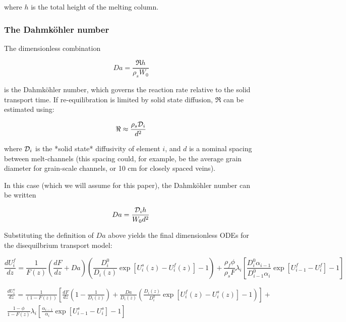 \documentclass[11pt]{article}
\begin{document}
where $h$ is the total height of the melting column.

    \hypertarget{the-dahmkuxf6hler-number}{%
\subsubsection{The Dahmköhler number}\label{the-dahmkuxf6hler-number}}

The dimensionless combination

\begin{equation}
    Da = \frac{\Re h}{\rho_s W_0}\label{eq:50}
\end{equation}

is the Dahmköhler number, which governs the reaction rate relative to the solid transport time. If re-equilibration is limited by solid state diffusion, $\Re$ can be estimated using:

\begin{equation}
    \Re \approx \frac{\rho_s{\cal D}_i}{d^2}\label{eq:51}
\end{equation}

where ${\cal D}_i$ is the *solid state* diffusivity of element $i$, and $d$ is a nominal spacing between melt-channels (this spacing could, for example, be the average grain diameter for grain-scale channels, or 10 cm for closely spaced veins). 

In this case (which we will assume for this paper),  the Dahmköhler number can be written

\begin{equation}
    Da = \frac{{\cal D}_i h}{W_0 d^2}\label{eq:52}
\end{equation}

Substituting the definition of $Da$ above yields the final dimensionless ODEs for the disequilbrium transport model:

\begin{equation}
    \frac{dU_i^f}{dz} = \frac{1}{F(z)}\left(\frac{dF}{dz} + Da\right)\left(\frac{D_i^0}{D_i(z)}\exp[U_i^s(z) - U_i^f(z)] - 1\right) + \frac{\rho_f \phi}{\rho_s F}\lambda_i \left[\frac{D_i^0 \alpha_{i-1}}{D_{i-1}^0 \alpha_i} \exp[U_{i-1}^f - U_i^f]-1\right]\label{eq:53}
\end{equation}

\begin{equation}\label{eq:54}
    \begin{aligned}
    	\frac{dU_i^s}{dz} = \frac{1}{(1 - F(z))}\left[\frac{dF}{dz} \left(1 - \frac{1}{D_i(z)}\right)+ \frac{Da}{D_i(z)}\left(\frac{D_i(z)}{D_i^0}\exp[U_i^f(z) - U_i^s(z)] - 1\right) \right]+ \\
	\frac{1-\phi}{1-F(z)}\lambda_i \left[\frac{\alpha_{i-1}}{\alpha_i} \exp[U_{i-1}^s - U_i^s]-1\right]
    \end{aligned}
\end{equation}
\end{document}
